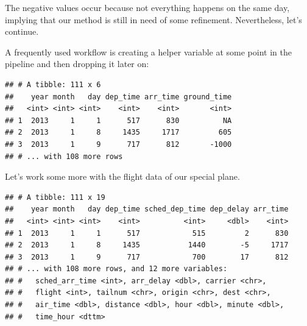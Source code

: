 \documentclass[]{book}
\newenvironment{Shaded}{}{}
\newcommand{\DataTypeTok}[1]{#1}
\newcommand{\KeywordTok}[1]{\textcolor[rgb]{0.00,0.00,1.00}{#1}}
\newcommand{\NormalTok}[1]{#1}
\newcommand{\OperatorTok}[1]{#1}
\newcommand{\StringTok}[1]{\textcolor[rgb]{0.00,0.50,0.50}{#1}}
\begin{document}
The negative values occur because not everything happens on the same day, implying that our method is still in need of some refinement.
Nevertheless, let's continue.

A frequently used workflow is creating a helper variable at some point in the pipeline and then dropping it later on:

\begin{Shaded}
\end{Shaded}

\begin{verbatim}
## # A tibble: 111 x 6
##    year month   day dep_time arr_time ground_time
##   <int> <int> <int>    <int>    <int>       <int>
## 1  2013     1     1      517      830          NA
## 2  2013     1     8     1435     1717         605
## 3  2013     1     9      717      812       -1000
## # ... with 108 more rows
\end{verbatim}

Let's work some more with the flight data of our special plane.

\begin{Shaded}
\end{Shaded}

\begin{verbatim}
## # A tibble: 111 x 19
##    year month   day dep_time sched_dep_time dep_delay arr_time
##   <int> <int> <int>    <int>          <int>     <dbl>    <int>
## 1  2013     1     1      517            515         2      830
## 2  2013     1     8     1435           1440        -5     1717
## 3  2013     1     9      717            700        17      812
## # ... with 108 more rows, and 12 more variables:
## #   sched_arr_time <int>, arr_delay <dbl>, carrier <chr>,
## #   flight <int>, tailnum <chr>, origin <chr>, dest <chr>,
## #   air_time <dbl>, distance <dbl>, hour <dbl>, minute <dbl>,
## #   time_hour <dttm>
\end{verbatim}
\end{document}
